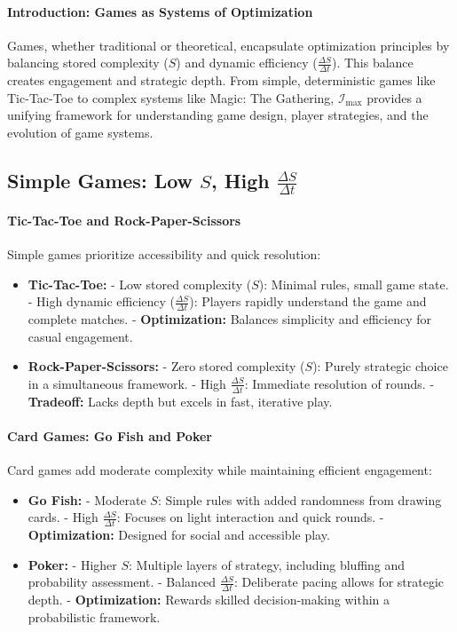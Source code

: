 \documentclass[12pt]{article}
\begin{document}
\paragraph{Introduction: Games as Systems of Optimization}
Games, whether traditional or theoretical, encapsulate optimization principles by balancing stored complexity (\(S\)) and dynamic efficiency (\(\frac{\Delta S}{\Delta t}\)). This balance creates engagement and strategic depth. From simple, deterministic games like Tic-Tac-Toe to complex systems like Magic: The Gathering, \(\mathcal{I}_{\text{max}}\) provides a unifying framework for understanding game design, player strategies, and the evolution of game systems.

\subsection{Simple Games: Low \(S\), High \(\frac{\Delta S}{\Delta t}\)}

\paragraph{Tic-Tac-Toe and Rock-Paper-Scissors}
Simple games prioritize accessibility and quick resolution:
\begin{itemize}
    \item \textbf{Tic-Tac-Toe:}
        - Low stored complexity (\(S\)): Minimal rules, small game state.
        - High dynamic efficiency (\(\frac{\Delta S}{\Delta t}\)): Players rapidly understand the game and complete matches.
        - \textbf{Optimization:} Balances simplicity and efficiency for casual engagement.
    \item \textbf{Rock-Paper-Scissors:}
        - Zero stored complexity (\(S\)): Purely strategic choice in a simultaneous framework.
        - High \(\frac{\Delta S}{\Delta t}\): Immediate resolution of rounds.
        - \textbf{Tradeoff:} Lacks depth but excels in fast, iterative play.
\end{itemize}

\paragraph{Card Games: Go Fish and Poker}
Card games add moderate complexity while maintaining efficient engagement:
\begin{itemize}
    \item \textbf{Go Fish:} 
        - Moderate \(S\): Simple rules with added randomness from drawing cards.
        - High \(\frac{\Delta S}{\Delta t}\): Focuses on light interaction and quick rounds.
        - \textbf{Optimization:} Designed for social and accessible play.
    \item \textbf{Poker:} 
        - Higher \(S\): Multiple layers of strategy, including bluffing and probability assessment.
        - Balanced \(\frac{\Delta S}{\Delta t}\): Deliberate pacing allows for strategic depth.
        - \textbf{Optimization:} Rewards skilled decision-making within a probabilistic framework.
\end{itemize}
\end{document}
